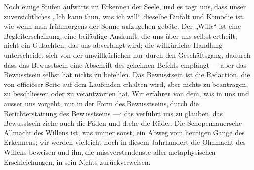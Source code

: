 Noch einige Stufen aufwärts im Erkennen der Seele, und es tagt uns, dass unser zuversichtliches „Ich kann thun, was ich will“ dieselbe Einfalt und Komödie ist, wie wenn man frühmorgens der Sonne aufzugehen geböte. Der „Wille“ ist eine Begleiterscheinung, eine beiläufige Auskunft, die uns über uns selbst ertheilt, nicht ein Gutachten, das uns abverlangt wird; die willkürliche Handlung unterscheidet sich von der unwillkürlichen nur durch den Geschäftsgang, dadurch dass das Bewusstsein eine Abschrift des geheimen Befehls empfängt — aber das Bewusstsein selbst hat nichts zu befehlen. Das Bewusstsein ist die Redaction, die von officiöser Seite auf dem Laufenden erhalten wird, aber nichts zu beantragen, zu beschliessen oder zu verantworten hat. Wir erfahren von dem, was in uns und ausser uns vorgeht, nur in der Form des Bewusstseins, durch die Berichterstattung des Bewusstseins —: das verführt uns zu glauben, das Bewusstsein ziehe auch die Fäden und drehe die Räder. Die Schopenhauersche Allmacht des Willens ist, was immer sonst, ein Abweg vom heutigen Gange des Erkennens; wir werden vielleicht noch in diesem Jahrhundert die Ohnmacht des Willens beweisen und ihn, die missverstandenste aller metaphysischen Erschleichungen, in sein Nichts zurückverweisen.
\par

